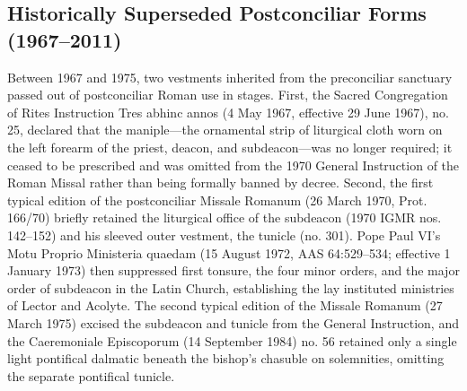 \subsection*{Historically Superseded Postconciliar Forms (1967--2011)}
\label{pc-obj-hist-subdeacon-tunicle-maniple}
Between 1967 and 1975, two vestments inherited from the preconciliar sanctuary passed out of postconciliar Roman use in stages. First, the Sacred Congregation of Rites Instruction Tres abhinc annos (4 May 1967, effective 29 June 1967), no. 25, declared that the maniple---the ornamental strip of liturgical cloth worn on the left forearm of the priest, deacon, and subdeacon---was no longer required; it ceased to be prescribed and was omitted from the 1970 General Instruction of the Roman Missal rather than being formally banned by decree. Second, the first typical edition of the postconciliar Missale Romanum (26 March 1970, Prot. 166/70) briefly retained the liturgical office of the subdeacon (1970 IGMR nos. 142--152) and his sleeved outer vestment, the tunicle (no. 301). Pope Paul VI's Motu Proprio Ministeria quaedam (15 August 1972, AAS 64:529--534; effective 1 January 1973) then suppressed first tonsure, the four minor orders, and the major order of subdeacon in the Latin Church, establishing the lay instituted ministries of Lector and Acolyte. The second typical edition of the Missale Romanum (27 March 1975) excised the subdeacon and tunicle from the General Instruction, and the Caeremoniale Episcoporum (14 September 1984) no. 56 retained only a single light pontifical dalmatic beneath the bishop's chasuble on solemnities, omitting the separate pontifical tunicle.

\PCDEntryRule

